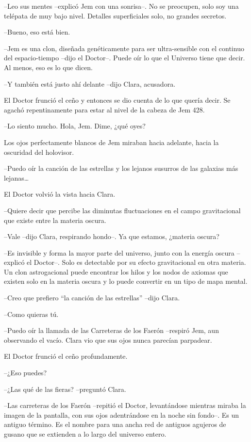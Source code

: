 {--Leo sus mentes --explicó Jem con una sonrisa--. No se preocupen, solo
 soy una telépata de muy bajo nivel. Detalles superficiales solo, no
grandes secretos.}

{--Bueno, eso está bien.}

{--Jem es una clon, diseñada genéticamente para ser ultra-sensible con el
 continuo del espacio-tiempo --dijo el Doctor--. Puede oír lo que el
Universo tiene que decir. Al menos, eso es lo que dicen.}

{--Y también está justo ahí delante --dijo Clara, acusadora.}

{El Doctor frunció el ceño y entonces se dio cuenta de lo que quería
 decir. Se agachó repentinamente para estar al nivel de la cabeza de Jem
428.}

{--Lo siento mucho. Hola, Jem. Dime, ¿qué oyes?}

{Los ojos perfectamente blancos de Jem miraban hacia adelante, hacia la
oscuridad del holovisor.}

{--Puedo oír la canción de las estrellas y los lejanos susurros de las
 galaxias más lejanas\ldots{}}

{El Doctor volvió la vista hacia Clara.}

{--Quiere decir que percibe las diminutas fluctuaciones en el campo
gravitacional que existe entre la materia oscura.}

{--Vale --dijo Clara, respirando hondo--. Ya que estamos, ¿materia
oscura?}

{--Es invisible y forma la mayor parte del universo, junto con la energía
 oscura --explicó el Doctor--. Solo es detectable por su efecto
 gravitacional en otra materia. Un clon astrogacional puede encontrar los
 hilos y los nodos de axiomas que existen solo en la materia oscura y lo
puede convertir en un tipo de mapa mental.}

{--Creo que prefiero ``la canción de las estrellas'' --dijo Clara.}

{--Como quieras tú.}

{--Puedo oír la llamada de las Carreteras de los Faerón --respiró Jem,
 aun observando el vacío. Clara vio que sus ojos nunca parecían
parpadear.}

{El Doctor frunció el ceño profundamente.}

{--¿Eso puedes?}

{--¿Las qué de las fieras? --preguntó Clara.}

{--Las carreteras de los Faerón --repitió el Doctor, levantándose
 mientras miraba la imagen de la pantalla, con sus ojos adentrándose en
 la noche sin fondo--. Es un antiguo término. Es el nombre para una ancha
 red de antiguos agujeros de gusano que se extienden a lo largo del
universo entero.}

